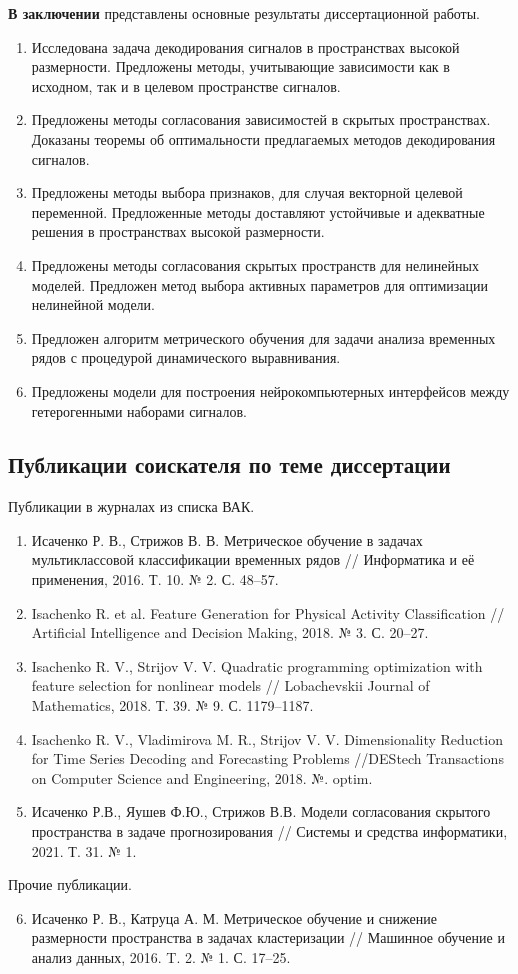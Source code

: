 \documentclass[11pt, a5paper]{dissert}
\begin{document}
\textbf{В заключении} представлены основные результаты диссертационной работы.

\begin{enumerate}
	\item Исследована задача декодирования сигналов в пространствах высокой размерности. 
	Предложены методы, учитывающие зависимости как в исходном, так и в целевом пространстве сигналов.
	\item Предложены методы согласования зависимостей в скрытых пространствах. 
	Доказаны теоремы об оптимальности предлагаемых методов декодирования сигналов. 
	\item Предложены методы выбора признаков, для случая векторной целевой переменной. 
	Предложенные методы доставляют устойчивые и адекватные решения в пространствах высокой размерности. 
	\item Предложены методы согласования скрытых пространств для нелинейных моделей. 
	Предложен метод выбора активных параметров для оптимизации нелинейной модели. 
	\item Предложен алгоритм метрического обучения для задачи анализа временных рядов с процедурой динамического выравнивания.
	\item Предложены модели для построения нейрокомпьютерных интерфейсов между гетерогенными наборами сигналов. 
\end{enumerate}

\subsection*{Публикации соискателя по теме диссертации}
Публикации в журналах из списка ВАК.
\vspace{0.3cm}
\begin{enumerate}
	\item Исаченко Р. В., Стрижов В. В. Метрическое обучение в задачах мультиклассовой классификации временных рядов // Информатика и её применения, 2016. Т. 10. № 2. С. 48--57.
	\item Isachenko R. et al. Feature Generation for Physical Activity Classification // Artificial Intelligence and Decision Making, 2018. № 3. С. 20--27.
	\item Isachenko R. V., Strijov V. V. Quadratic programming optimization with feature selection for nonlinear models // Lobachevskii Journal of Mathematics, 2018. Т. 39. № 9. С. 1179--1187.
	\item Isachenko R. V., Vladimirova M. R., Strijov V. V. Dimensionality Reduction for Time Series Decoding and Forecasting Problems //DEStech Transactions on Computer Science and Engineering, 2018. №. optim.
	\item Исаченко Р.В., Яушев Ф.Ю., Стрижов В.В. Модели согласования скрытого пространства в задаче прогнозирования // Системы и средства информатики, 2021. Т. 31. № 1.
\end{enumerate}

\vspace{0.4cm}
{Прочие публикации.}
\vspace{0.2cm}
\begin{enumerate}
\setcounter{enumi}{5}
	\item Исаченко Р. В., Катруца А. М. Метрическое обучение и снижение размерности пространства в задачах кластеризации // Машинное обучение и анализ данных, 2016. T. 2. № 1. С. 17--25.
\end{enumerate}
\end{document}
